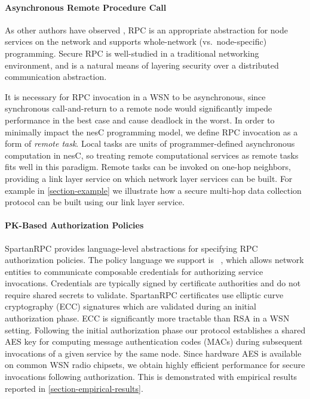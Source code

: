 \paragraph{Asynchronous Remote Procedure Call} As other authors have
observed \cite{may-tinyrpc-2007}, RPC is an appropriate abstraction for
node services on the network and supports whole-network
(vs.~node-specific) programming. Secure RPC is well-studied in a
traditional networking environment, and is a natural means of layering
security over a distributed communication abstraction.

It is necessary for RPC invocation in a WSN to be asynchronous, since
synchronous call-and-return to a remote node would significantly impede
performance in the best case and cause deadlock in the worst. In order
to minimally impact the nesC programming model, we define RPC invocation
as a form of \emph{remote task}. Local tasks are units of
programmer-defined asynchronous computation in nesC, so treating remote
computational services as remote tasks fits well in this paradigm.
Remote tasks can be invoked on one-hop neighbors, providing a link layer
service on which network layer services can be built. For example in
\autoref{section-example} we illustrate how a secure multi-hop data
collection protocol can be built using our link layer service.

\paragraph{PK-Based Authorization Policies} SpartanRPC provides
language-level abstractions for specifying RPC authorization policies.
The policy language we support is \RT\ \cite{Li:DRBTMF}, which allows
network entities to communicate composable credentials for authorizing
service invocations. Credentials are typically signed by certificate
authorities and do not require shared secrets to validate. SpartanRPC
certificates use elliptic curve cryptography (ECC) \cite{bertoni-2006}
signatures which are validated during an initial authorization phase.
ECC is significantly more tractable than RSA in a WSN setting. Following
the initial authorization phase our protocol establishes a shared AES
key for computing message authentication codes (MACs) during subsequent
invocations of a given service by the same node. Since hardware AES is
available on common WSN radio chipsets, we obtain highly efficient
performance for secure invocations following authorization. This is
demonstrated with empirical results reported in
\autoref{section-empirical-results}.

